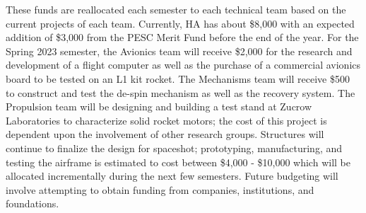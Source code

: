 These funds are reallocated each semester to each technical team based on the current projects of each team.  Currently, HA has about \$8,000 with an expected addition of \$3,000 from the PESC Merit Fund before the end of the year.  For the Spring 2023 semester, the Avionics team will receive \$2,000 for the research and development of a flight computer as well as the purchase of a commercial avionics board to be tested on an L1 kit rocket.  The Mechanisms team will receive \$500 to construct and test the de-spin mechanism as well as the recovery system.  The Propulsion team will be designing and building a test stand at Zucrow Laboratories to characterize solid rocket motors; the cost of this project is dependent upon the involvement of other research groups.  Structures will continue to finalize the design for spaceshot; prototyping, manufacturing, and testing the airframe is estimated to cost between \$4,000 - \$10,000 which will be allocated  incrementally during the next few semesters.  Future budgeting will involve attempting to obtain funding from companies, institutions, and foundations.
